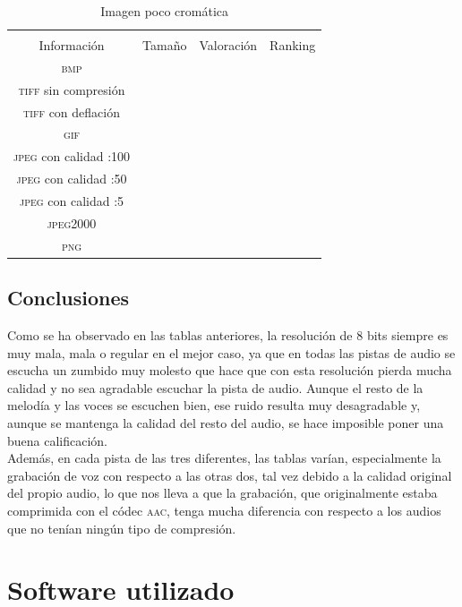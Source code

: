 \documentclass[11pt,a4paper]{article}
\begin{document}
\begin{table}[H]
\centering
\begin{tabular}{|c|c|c|c|}
\hline
\diagbox[width=15em]{\textit{Códec}/Formato}{\\Información} & Tamaño & Valoración & Ranking \\
\hline
\textsc{bmp} &  &  &  \\ \hline
\textsc{tiff} sin compresión &  &  &  \\ \hline
\textsc{tiff} con deflación &  &  &  \\ \hline
\textsc{gif} &  &  &  \\ \hline
\textsc{jpeg} con calidad :100 &  &  &  \\ \hline
\textsc{jpeg} con calidad :50 &  &  &  \\ \hline
\textsc{jpeg} con calidad :5 &  &  &  \\ \hline
\textsc{jpeg2000} &  &  &  \\ \hline
\textsc{png} &  &  &  \\ \hline
\end{tabular}
\caption{Imagen poco cromática}
\label{tab:my-table}
\end{table}


\subsection{Conclusiones}

Como se ha observado en las tablas anteriores, la resolución de 8 bits siempre es muy mala, mala o regular en el mejor caso, ya que en todas las pistas de audio se escucha un zumbido muy molesto que hace que con esta resolución pierda mucha calidad y no sea agradable escuchar la pista de audio. Aunque el resto de la melodía y las voces se escuchen bien, ese ruido resulta muy desagradable y, aunque se mantenga la calidad del resto del audio, se hace imposible poner una buena calificación.\\

Además, en cada pista de las tres diferentes, las tablas varían, especialmente la grabación de voz con respecto a las otras dos, tal vez debido a la calidad original del propio audio, lo que nos lleva a que la grabación, que originalmente estaba comprimida con el códec \textsc{aac}, tenga mucha diferencia con respecto a los audios que no tenían ningún tipo de compresión.


\section{Software utilizado}
\end{document}
